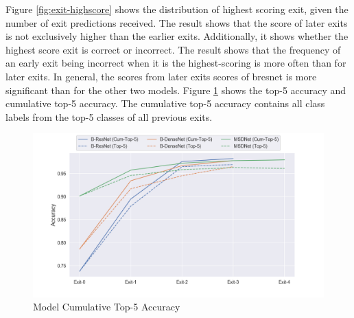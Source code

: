 Figure \ref{fig:exit-highscore} shows the distribution of highest scoring exit, given the number of exit predictions received. The result shows that the score of later exits is not exclusively higher than the earlier exits. Additionally, it shows whether the highest score exit is correct or incorrect. The result shows that the frequency of an early exit being incorrect when it is the highest-scoring is more often than for later exits. In general, the scores from later exits scores of \gls{bresnet} is more significant than for the other two models. 
Figure \ref{fig:top-5-cumulative}  shows the top-5 accuracy and cumulative top-5 accuracy. The cumulative top-5 accuracy contains all class labels from the top-5 classes of all previous exits. 
\begin{figure}
	\centering
	\includegraphics[width=.8\linewidth]{figures/edge/top5cumulative}
	\caption[Top-5 Cumulative]{Model Cumulative Top-5 Accuracy}
	\label{fig:top-5-cumulative}
\end{figure}

